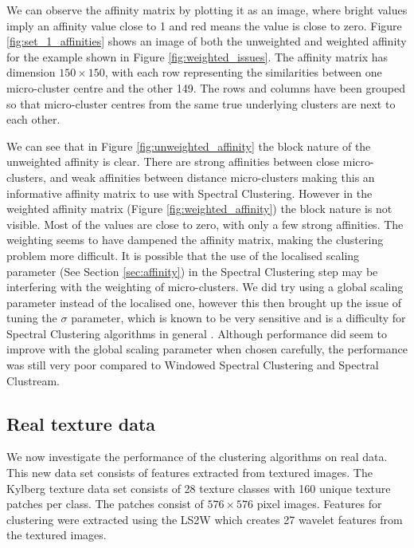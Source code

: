 We can observe the affinity matrix by plotting it as an image, where bright values imply an affinity value close to 1 and red means the value is close to zero. Figure \ref{fig:set_1_affinities} shows an image of both the unweighted and weighted affinity for the example shown in Figure \ref{fig:weighted_issues}. The affinity matrix has dimension $150 \times 150$, with each row representing the similarities between one micro-cluster centre and the other 149. The rows and columns have been grouped so that micro-cluster centres from the same true underlying clusters are next to each other. 

We can see that in Figure \ref{fig:unweighted_affinity} the block nature of the unweighted affinity is clear. There are strong affinities between close micro-clusters, and weak affinities between distance micro-clusters making this an informative affinity matrix to use with Spectral Clustering. However in the weighted affinity matrix (Figure \ref{fig:weighted_affinity}) the block nature is not visible. Most of the values are close to zero, with only a few strong affinities. The weighting seems to have dampened the affinity matrix, making the clustering problem more difficult.  It is possible that the use of the localised scaling parameter (See Section \ref{sec:affinity}) in the Spectral Clustering step may be interfering with the weighting of micro-clusters. We did try using a global scaling parameter instead of the localised one, however this then brought up the issue of tuning the $\sigma$ parameter, which is known to be very sensitive and is a difficulty for Spectral Clustering algorithms in general \citep{Luxburg2008}. Although performance did seem to improve with the global scaling parameter when chosen carefully, the performance was still very poor compared to Windowed Spectral Clustering and Spectral Clustream.


\subsection{Real texture data}

We now investigate the performance of the clustering algorithms on real data. This new data set consists of features extracted from  textured images. The Kylberg  texture data set \citep{kylberg2011c} consists of 28 texture classes with 160 unique texture patches per class. The patches consist of $576 \times 576$ pixel images. Features for clustering were extracted using the LS2W \citep{Eckley2011} which creates 27 wavelet features from the textured images. 

